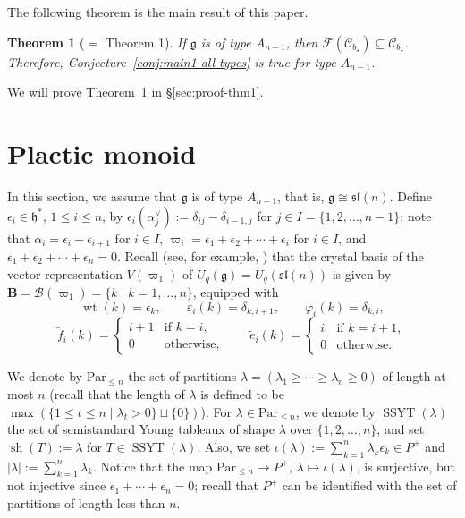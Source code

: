 \documentclass[reqno]{amsart}
\newtheorem{theorem}{Theorem}[section]
\theoremstyle{definition}
\theoremstyle{remark}
\numberwithin{equation}{section}
\newcommand{\g}{\mathfrak{g}}
\newcommand{\B}{\mathcal{B}}
\newcommand{\F}{\mathcal{F}}
\newcommand{\wt}{\operatorname{wt}}
\newcommand{\te}{\tilde e}
\newcommand{\tf}{\tilde f}
\newcommand{\bstar}{b_\star}
\newcommand{\shape}{\operatorname{sh}}
\begin{document}
	The following theorem is the main result of this paper.
	
	\begin{theorem}[$=$ Theorem 1]\label{thm:main1}
		If $\g$ is of type $A_{n-1}$,
		then $\F(\mathcal{C}_{\bstar})\subseteq \mathcal{C}_{\bstar}$.
		Therefore, Conjecture~\ref{conj:main1-all-types} is true for type $A_{n-1}$.
	\end{theorem}
	
	We will prove Theorem~\ref{thm:main1} in \S\ref{sec:proof-thm1}.
	
	\newcommand{\SSYT}{\operatorname{SSYT}}
	\newcommand{\Par}{\mathrm{Par}}
	
	
	\section{Plactic monoid}\label{sec:plactic}
	In this section, 
	we assume that $\g$ is of type $A_{n-1}$, that is,
	$\g \cong \mathfrak{sl}(n)$.
	Define $\epsilon_{i} \in \mathfrak{h}^{\ast}$, $1\le i\le n$,
	by $\epsilon_{i} (\alpha_{j}^{\vee}):=\delta_{ij}-\delta_{i-1,j}$ for
	$j\in I=\{1,2,\dots,n-1\}$;
	note that
	$\alpha_{i} = \epsilon_{i} - \epsilon_{i+1}$ for $i \in I$,
	$\varpi_{i} = \epsilon_{1} + \epsilon_{2} + \cdots + \epsilon_{i}$ for $i \in I$,
	and $\epsilon_{1} + \epsilon_{2} + \cdots + \epsilon_{n} = 0$.
	Recall (see, for example, \cite{bumpschilling}) that the crystal basis of the vector
	representation $V(\varpi_1)$ of $U_q(\g)=U_q(\mathfrak{sl}(n))$ is given by
	$\mathbf{B}=\B(\varpi_1)=\{\boxed{k}\mid k=1,\dots,n\}$, equipped with 
	\[
	\wt(\boxed{k})=\epsilon_k,\qquad
	\varepsilon_i(\boxed{k})=\delta_{k,i+1},\qquad
	\varphi_i(\boxed{k})=\delta_{k,i},
	\]
	\[
	\tf_i(\boxed{k})=\begin{cases} \boxed{i+1} &\text{if } k=i,\\ 0& \text{otherwise,}\end{cases}
	\qquad
	\te_i(\boxed{k})=\begin{cases} \boxed{i} &\text{if }  k=i+1,\\ 0 &\text{otherwise.}\end{cases}
	\]
	
	We denote by $\Par_{\le n}$ the set of partitions
	$\lambda=(\lambda_1\ge\cdots\ge\lambda_n\ge0)$ of length at most $n$
	(recall that the length of $\lambda$ is defined to be
	$\max(\{1\le t\le n\mid\lambda_t>0\}\sqcup\{0\})$).
	For $\lambda\in\Par_{\le n}$,
	we denote by $\SSYT(\lambda)$ the set of
	semistandard Young tableaux of shape $\lambda$ over $\{1,2,\dots,n\}$, and set
	$\shape(T):=\lambda$ for $T\in\SSYT(\lambda)$.
	Also, we set $\iota(\lambda):=\sum_{k=1}^{n}\lambda_k\epsilon_k\in P^+$ and $|\lambda|:=\sum_{k=1}^{n}\lambda_k$.
	Notice that the map $\Par_{\le n}\rightarrow P^+$,
	$\lambda\mapsto \iota(\lambda)$, is surjective,
	but not injective since $\epsilon_{1}+\cdots+\epsilon_{n}=0$;
	recall that $P^+$ can be identified with the set of partitions of length less than $n$.
	
\end{document}
